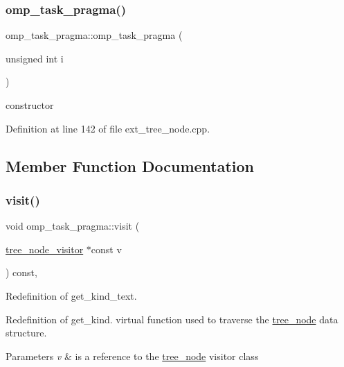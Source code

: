 \subsubsection{\texorpdfstring{omp\+\_\+task\+\_\+pragma()}{omp\_task\_pragma()}}
{\footnotesize\ttfamily omp\+\_\+task\+\_\+pragma\+::omp\+\_\+task\+\_\+pragma (\begin{DoxyParamCaption}\item[{unsigned int}]{i }\end{DoxyParamCaption})\hspace{0.3cm}{\ttfamily [explicit]}}



constructor 



Definition at line 142 of file ext\+\_\+tree\+\_\+node.\+cpp.



\subsection{Member Function Documentation}
\mbox{\label{structomp__task__pragma_ad7ce2ba5852e3a4404ef8dad6c6034be}} 
\subsubsection{\texorpdfstring{visit()}{visit()}}
{\footnotesize\ttfamily void omp\+\_\+task\+\_\+pragma\+::visit (\begin{DoxyParamCaption}\item[{\hyperlink{classtree__node__visitor}{tree\+\_\+node\+\_\+visitor} $\ast$const}]{v }\end{DoxyParamCaption}) const\hspace{0.3cm}{\ttfamily [override]}, {\ttfamily [virtual]}}



Redefinition of get\+\_\+kind\+\_\+text. 

Redefinition of get\+\_\+kind. virtual function used to traverse the \hyperlink{classtree__node}{tree\+\_\+node} data structure. 
\begin{DoxyParams}{Parameters}
{\em v} & is a reference to the \hyperlink{classtree__node}{tree\+\_\+node} visitor class \\
\hline
\end{DoxyParams}


